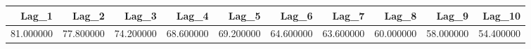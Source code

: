 \begin{tabular}{rrrrrrrrrr}
\toprule
Lag_1 & Lag_2 & Lag_3 & Lag_4 & Lag_5 & Lag_6 & Lag_7 & Lag_8 & Lag_9 & Lag_10 \\
\midrule
81.000000 & 77.800000 & 74.200000 & 68.600000 & 69.200000 & 64.600000 & 63.600000 & 60.000000 & 58.000000 & 54.400000 \\
\bottomrule
\end{tabular}
